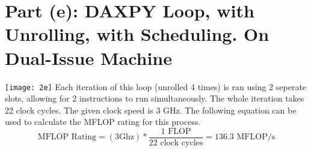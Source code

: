 \documentclass[12pt, letterpaper, titlepage, hidelinks]{article}
\begin{document}
\section{Part (e): DAXPY Loop, with Unrolling, with Scheduling. On  Dual-Issue Machine}
	\texttt{[image: 2e]}
	Each iteration of this loop (unrolled 4 times) is ran using 2 seperate slots, allowing for 2 instructions to run simultaneously. The whole iteration takes 22 clock cycles. The given clock speed is 3 GHz. The following equation can be used to calculate the MFLOP rating for this process.
	\begin{equation}
		\text{MFLOP Rating} = (3 \text{{Ghz}}) * \frac{1 \text{ FLOP}}{22 \text{ clock cycles}} = 136.3 \text{ MFLOP/s}
	\end{equation}
\end{document}
